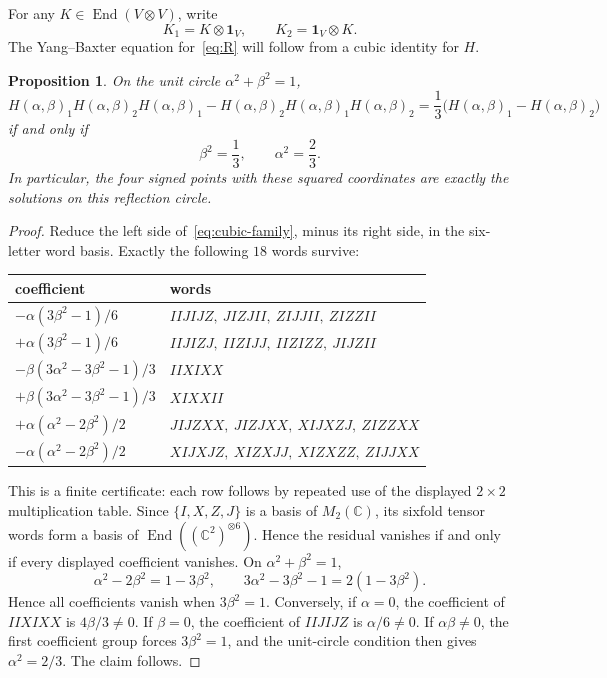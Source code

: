\documentclass[11pt]{article}
\newtheorem{proposition}[theorem]{Proposition}
\theoremstyle{remark}
\newcommand{\Id}{\mathbf 1}
\newcommand{\End}{\operatorname{End}}
\newcommand{\bbC}{\mathbb C}
\begin{document}
For any \(K\in\End(V\otimes V)\), write
\[
  K_1=K\otimes\Id_V,\qquad K_2=\Id_V\otimes K.
\]
The Yang--Baxter equation for~\eqref{eq:R} will follow from a cubic identity
for \(H\).

\begin{proposition}\label{prop:circle}
On the unit circle \(\alpha^2+\beta^2=1\),
\begin{equation}
  H(\alpha,\beta)_1H(\alpha,\beta)_2H(\alpha,\beta)_1
  -
  H(\alpha,\beta)_2H(\alpha,\beta)_1H(\alpha,\beta)_2
  =
  \frac13\bigl(H(\alpha,\beta)_1-H(\alpha,\beta)_2\bigr)
  \label{eq:cubic-family}
\end{equation}
if and only if
\[
  \beta^2=\frac13,\qquad\alpha^2=\frac23.
\]
In particular, the four signed points with these squared coordinates are
exactly the solutions on this reflection circle.
\end{proposition}

\begin{proof}
Reduce the left side of~\eqref{eq:cubic-family}, minus its right side, in
the six-letter word basis.  Exactly the following \(18\) words survive:
\begin{center}
\small
\renewcommand{\arraystretch}{1.16}
\begin{tabular}{>{\raggedright\arraybackslash}p{}
                >{\raggedright\arraybackslash}p{}}
\toprule
coefficient & words\\
\midrule
\(-\alpha(3\beta^2-1)/6\) &
\(IIJIJZ,\ JIZJII,\ ZIJJII,\ ZIZZII\)\\
\(+\alpha(3\beta^2-1)/6\) &
\(IIJIZJ,\ IIZIJJ,\ IIZIZZ,\ JIJZII\)\\
\(-\beta(3\alpha^2-3\beta^2-1)/3\) &
\(IIXIXX\)\\
\(+\beta(3\alpha^2-3\beta^2-1)/3\) &
\(XIXXII\)\\
\(+\alpha(\alpha^2-2\beta^2)/2\) &
\(JIJZXX,\ JIZJXX,\ XIJXZJ,\ ZIZZXX\)\\
\(-\alpha(\alpha^2-2\beta^2)/2\) &
\(XIJXJZ,\ XIZXJJ,\ XIZXZZ,\ ZIJJXX\)\\
\bottomrule
\end{tabular}
\end{center}
This is a finite certificate: each row follows by repeated use of the
displayed \(2\times2\) multiplication table.  Since \(\{I,X,Z,J\}\) is a
basis of \(M_2(\bbC)\), its sixfold tensor words form a basis of
\(\End((\bbC^2)^{\otimes6})\).  Hence the residual vanishes if and only if
every displayed coefficient vanishes.  On
\(\alpha^2+\beta^2=1\),
\[
  \alpha^2-2\beta^2=1-3\beta^2,\qquad
  3\alpha^2-3\beta^2-1=2(1-3\beta^2).
\]
Hence all coefficients vanish when \(3\beta^2=1\).  Conversely, if
\(\alpha=0\), the coefficient of \(IIXIXX\) is
\(4\beta/3\ne0\).  If \(\beta=0\), the coefficient of \(IIJIJZ\) is
\(\alpha/6\ne0\).  If \(\alpha\beta\ne0\), the first coefficient group forces
\(3\beta^2=1\), and the unit-circle condition then gives
\(\alpha^2=2/3\).  The claim follows.
\end{proof}
\end{document}

